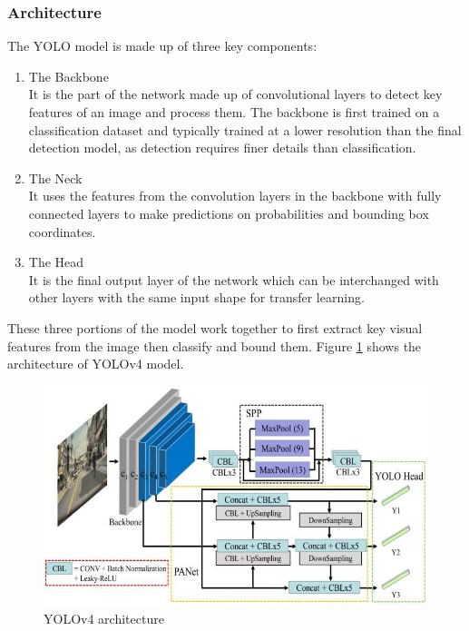 \subsubsection{Architecture}
The YOLO model is made up of three key components:
\begin{enumerate}
	\item The Backbone \\
	It is the part of the network made up of convolutional layers to detect key features of an image and process them. The backbone is first trained on a classification dataset and typically trained at a lower resolution than the final detection model, as detection requires finer details than classification.

	\item The Neck \\
	It uses the features from the convolution layers in the backbone with fully connected layers to make predictions on probabilities and bounding box coordinates. 
	
	\item The Head \\
	It is the final output layer of the network which can be interchanged with other layers with the same input shape for transfer learning. 	
\end{enumerate} 
These three portions of the model work together to first extract key visual features from the image then classify and bound them. Figure \ref{fig:yolov4-architecture} shows the architecture of YOLOv4 model.

\begin{figure}[H]
	\centering
	\includegraphics[width=0.85\linewidth]{Images/YOLOV4-research-gate}
	\caption{YOLOv4 architecture}
	\label{fig:yolov4-architecture}
\end{figure}


